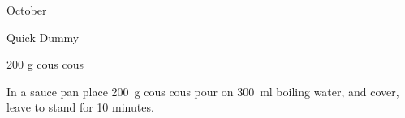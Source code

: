 \begin{menu}{October}
    \begin{recipe}{1}{Quick Dummy}%
		\begin{ingredients}
		200 g cous cous  \\
	
		\end{ingredients}
	
	
    \begin{instructions}
    \item 
    In a
    sauce pan 
    place
    200~g  cous cous
    pour on
    300~ml  boiling water,
    and cover, leave to stand for 10 minutes.
  
    \end{instructions}
    \end{recipe}%
  
    \clearpage
    \end{menu}
	
